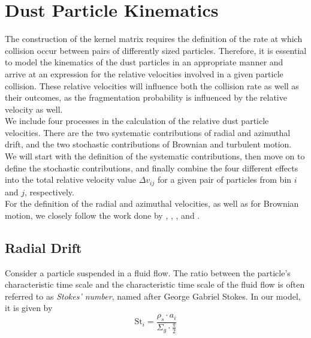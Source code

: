 

\clearpage\section{Dust Particle Kinematics}

    The construction of the kernel matrix requires the definition of the rate 
    at which collision occur between pairs of differently sized particles.
    Therefore, it is essential to model the kinematics of the dust particles 
    in an appropriate manner and arrive at an expression for the 
    relative velocities involved in a given particle collision.
    These relative velocities will influence both the collision rate as 
    well as their outcomes, as the fragmentation probability is influenced 
    by the relative velocity as well. \\

    We include four processes in the calculation of the relative dust particle velocities.
    There are the two systematic contributions of radial and azimuthal drift, 
    and the two stochastic contributions of Brownian and turbulent motion. \\

    We will start with the definition of the systematic contributions, then move on to define 
    the stochastic contributions, and finally combine the four different effects into the 
    total relative velocity value $\Delta v_{ij}$ for a given pair of particles from 
    bin $i$ and $j$, respectively. \\

    For the definition of the radial and azimuthal velocities, as well as for Brownian motion, 
    we closely follow the work done by \cite{weidenschilling_1977}, \cite{nakagawa_1986}, 
    \cite{birnstiel_dullemond_brauer_2010}, and \cite{dullemond_dominik_2004}.

    \subsection{Radial Drift}

        Consider a particle suspended in a fluid flow. The ratio between the particle's 
        characteristic time scale and the characteristic time scale of the fluid flow
        is often referred to as \textit{Stokes' number}, named after George Gabriel Stokes. 
        In our model, it is given by
        \begin{equation}
            \text{St}_i=\frac{\rho_s\cdot a_i}{\Sigma_g\cdot\frac{\pi}{2}}
        \end{equation}

